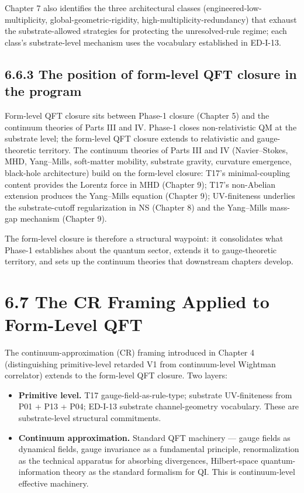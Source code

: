\documentclass[11pt]{book}
\begin{document}
Chapter 7 also identifies the three architectural classes (engineered-low-multiplicity, global-geometric-rigidity, high-multiplicity-redundancy) that exhaust the substrate-allowed strategies for protecting the unresolved-rule regime; each class's substrate-level mechanism uses the vocabulary established in ED-I-13.

\subsection{6.6.3 The position of form-level QFT closure in the program}

Form-level QFT closure sits between Phase-1 closure (Chapter 5) and the continuum theories of Parts III and IV. Phase-1 closes non-relativistic QM at the substrate level; the form-level QFT closure extends to relativistic and gauge-theoretic territory. The continuum theories of Parts III and IV (Navier–Stokes, MHD, Yang–Mills, soft-matter mobility, substrate gravity, curvature emergence, black-hole architecture) build on the form-level closure: T17's minimal-coupling content provides the Lorentz force in MHD (Chapter 9); T17's non-Abelian extension produces the Yang–Mills equation (Chapter 9); UV-finiteness underlies the substrate-cutoff regularization in NS (Chapter 8) and the Yang–Mills mass-gap mechanism (Chapter 9).

The form-level closure is therefore a structural waypoint: it consolidates what Phase-1 establishes about the quantum sector, extends it to gauge-theoretic territory, and sets up the continuum theories that downstream chapters develop.

\section{6.7 The CR Framing Applied to Form-Level QFT}

The continuum-approximation (CR) framing introduced in Chapter 4 (distinguishing primitive-level retarded V1 from continuum-level Wightman correlator) extends to the form-level QFT closure. Two layers:

\begin{itemize}
\item \textbf{Primitive level.} T17 gauge-field-as-rule-type; substrate UV-finiteness from P01 + P13 + P04; ED-I-13 substrate channel-geometry vocabulary. These are substrate-level structural commitments.
\item \textbf{Continuum approximation.} Standard QFT machinery — gauge fields as dynamical fields, gauge invariance as a fundamental principle, renormalization as the technical apparatus for absorbing divergences, Hilbert-space quantum-information theory as the standard formalism for QI. This is continuum-level effective machinery.
\end{itemize}
\end{document}
